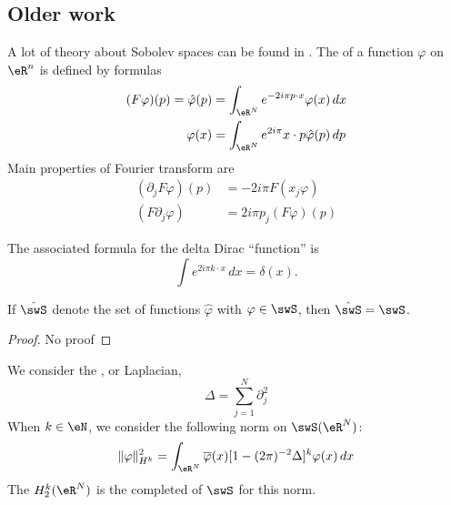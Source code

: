\subsection{Older work}
\label{subsec_Sobolev}

A lot of theory about Sobolev spaces can be found in \cite{Maslov,Taylor_PDO}. The  of a function $\varphi$ on $\eR^n$ is defined by formulas
\begin{subequations}
\begin{align}
  (F\varphi)(p)=\hat\varphi(p)&=\int_{\eR^N} e^{-2i\pi p\cdot x}\varphi(x)\,dx\\
	\varphi(x)&=\int_{\eR^{N}} e^{2i\pi}x\cdot p\hat\varphi(p)\,dp
\end{align}
\end{subequations}
Main properties of Fourier transform are
\begin{subequations} \label{subeq_prop_Four}
\begin{align}
(\partial_jF\varphi)(p)&=-2i\pi F(x_j\varphi)\\
	(F\partial_j\varphi)&=2i\pi p_j(F\varphi)(p)
\end{align}
\end{subequations}

The associated formula for the delta Dirac ``function'' is 
\begin{equation}
  \int e^{2i\pi k\cdot x}\,dx=\delta(x).
\end{equation}

\begin{proposition}
If $\hat\swS$ denote the set of functions $\hat\varphi$ with $\varphi\in\swS$, then $\hat\swS=\swS$. 
\end{proposition}

\begin{proof}
No proof
\end{proof}

We consider the , or Laplacian,
\begin{equation}
\Delta=\sum_{j=1}^{N}\partial_j^2
\end{equation}
When $k\in\eN$, we consider the following norm on $\swS(\eR^N)$:
\begin{equation} \label{eq_def_norm_Sob}
  \| \varphi \|_{H^k}^2=\int_{\eR^N}\overline{\varphi}(x)[1-(2\pi)^{-2}\Delta]^k\varphi(x)\,dx
\end{equation}
The  $H^k_2(\eR^N)$ is the completed of $\swS$ for this norm.

